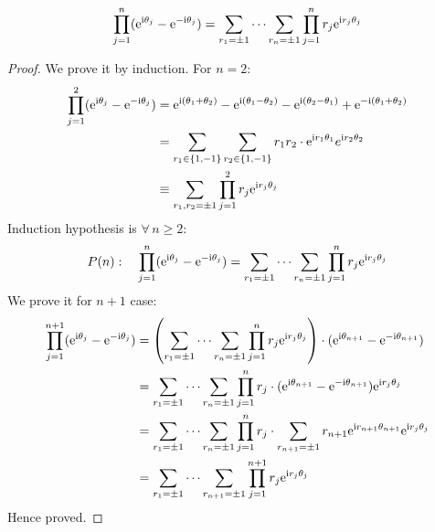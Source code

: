 \begin{clm}\label{clm:induction}
        \begin{equation*}
        \prod_{j=1}^n (\mathrm e^{\mathrm i \theta_j} - \mathrm e^{-\mathrm i \theta_j}) = \sum_{r_1=\pm1}\cdots \sum_{r_n = \pm 1} \prod_{j=1}^n r_j \mathrm e^{\mathrm i r_j \theta_j}
        \end{equation*}
\end{clm}
    \begin{proof}
    We prove it by induction. For $n=2$:
    \begin{align*}
        \prod_{j=1}^2 (\mathrm e^{\mathrm i\theta_j} - \mathrm e^{-\mathrm i\theta_j}) &= \mathrm e^{\mathrm i(\theta_1 + \theta_2)} - \mathrm e^{\mathrm i(\theta_1 - \theta_2)} - \mathrm e^{\mathrm i(\theta_2 - \theta_1)} + \mathrm e^{-\mathrm i(\theta_1 + \theta_2)}\\
        &= \sum_{r_1 \in \{1, -1\}}\sum_{r_2 \in \{1, -1\}} r_1r_2 \cdot \mathrm e^{\mathrm i r_1 \theta_1} e^{\mathrm i r_2 \theta_2}\\
        &\equiv \sum_{r_1, r_2 = \pm 1} \prod_{j=1}^2 r_j \mathrm e^{\mathrm i r_j \theta_j}
    \end{align*}
    Induction hypothesis is $\forall \, n \geq 2$:
    \begin{equation*}
        P(n):\quad \prod_{j=1}^n (\mathrm e^{\mathrm i \theta_j} - \mathrm e^{-\mathrm i \theta_j}) = \sum_{r_1=\pm1}\cdots \sum_{r_n = \pm 1} \prod_{j=1}^n r_j \mathrm e^{\mathrm i r_j \theta_j}
    \end{equation*}
    We prove it for $n+1$ case:
    \begin{align*}
        \prod_{j=1}^{n+1} (\mathrm e^{\mathrm i \theta_j} - \mathrm e^{-\mathrm i \theta_j})
        &= \left( \sum_{r_1=\pm1}\cdots \sum_{r_n = \pm 1} \prod_{j=1}^n r_j \mathrm e^{\mathrm i r_j \theta_j}\right) \cdot (\mathrm e^{\mathrm i \theta_{n+1}} - \mathrm e^{-\mathrm i \theta_{n+1}})\\
        &= \sum_{r_1=\pm1}\cdots \sum_{r_n = \pm 1} \prod_{j=1}^n r_j \cdot (\mathrm e^{\mathrm i \theta_{n+1}} - \mathrm e^{-\mathrm i \theta_{n+1}}) \mathrm e^{\mathrm i r_j \theta_j}\\
        &= \sum_{r_1=\pm1}\cdots \sum_{r_n = \pm 1} \prod_{j=1}^n r_j \cdot \sum_{r_{n+1} = \pm 1} r_{n+1} \mathrm e^{\mathrm i r_{n+1}\theta_{n+1}} \mathrm e^{\mathrm i r_j \theta_j}\\
        &= \sum_{r_1=\pm1}\cdots \sum_{r_{n+1} = \pm 1} \prod_{j=1}^{n+1} r_j \mathrm e^{\mathrm i r_j \theta_j}
    \end{align*}
    Hence proved.
    \end{proof}

